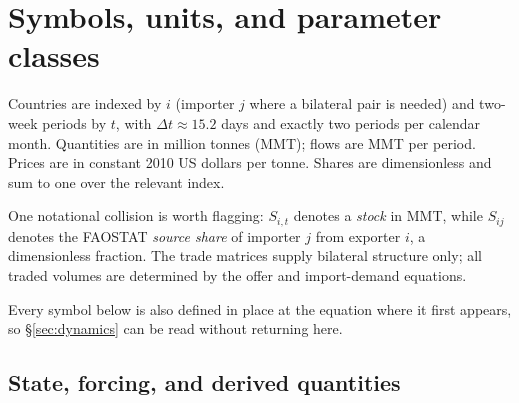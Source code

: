\section{Symbols, units, and parameter classes}
\label{sec:notation}

Countries are indexed by \(i\) (importer \(j\) where a bilateral pair is
needed) and two-week periods by \(t\), with \(\Delta t\approx 15.2\) days
and exactly two periods per calendar month. Quantities are in million
tonnes (MMT); flows are MMT per period. Prices are in constant 2010 US
dollars per tonne. Shares are dimensionless and sum to one over the
relevant index.

One notational collision is worth flagging: \(S_{i,t}\) denotes a
\emph{stock} in MMT, while \(S_{ij}\) denotes the FAOSTAT \emph{source
share} of importer \(j\) from exporter \(i\), a dimensionless fraction.
The trade matrices supply bilateral structure only; all traded volumes are
determined by the offer and import-demand equations.

Every symbol below is also defined in place at the equation where it first
appears, so \S\ref{sec:dynamics} can be read without returning here.

\subsection{State, forcing, and derived quantities}

